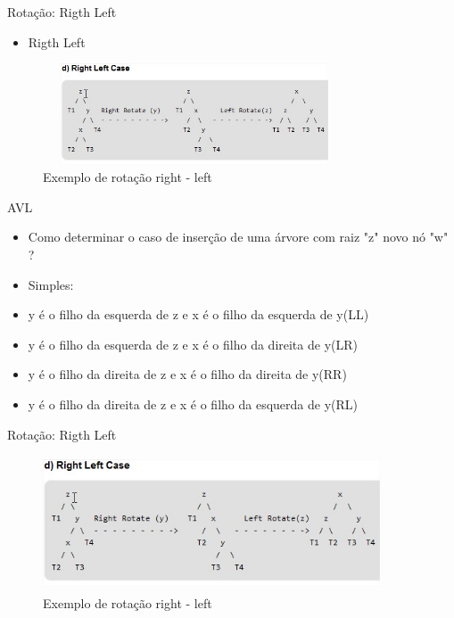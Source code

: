 \begin{frame}
	\begin{block}{Rotação: Rigth Left}
		\begin{itemize}
			\item Rigth Left
		\end{itemize}
		\begin{figure}[!htb]
			\centering	  				
			\includegraphics[height=3cm, width = 9cm]{./pic/rigthLeft.jpg}
			\caption{Exemplo de rotação right - left \cite{GEEKS_2018}}
		\end{figure}
	\end{block}
\end{frame}

\begin{frame}
	\begin{block}{AVL}
		\begin{itemize}
			\item Como determinar o caso de inserção de uma árvore com raiz "z" novo nó "w" ?
			
			\item Simples:
			
			\item y é o filho da esquerda de z e x é o filho da esquerda de y(LL)
			\item y é o filho da esquerda de z e x é o filho da direita de y(LR)
			\item y é o filho da direita de z e x é o filho da direita de y(RR)
			\item y é o filho da direita de z e x é o filho da esquerda de y(RL)
		\end{itemize}
	\end{block}
\end{frame}


\begin{frame}
	\begin{block}{Rotação: Rigth Left}
		\begin{figure}[!htb]
			\centering	  				
			\includegraphics[height=4cm, width = 10cm]{./pic/rigthLeft.jpg}
			\caption{Exemplo de rotação right - left  \cite{GEEKS_2018}}
		\end{figure}
	\end{block}
\end{frame}


